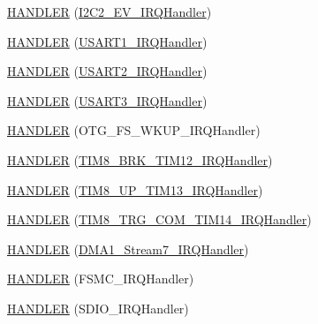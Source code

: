 \begin{DoxyCompactItemize}
\item 
\hyperlink{group___p_i_o_s_ga03be10db0a301a884516b2bec72fd339}{\-H\-A\-N\-D\-L\-E\-R} (\hyperlink{group___revo_mini_gaa32a80208798d6132876a58823ff6202}{\-I2\-C2\-\_\-\-E\-V\-\_\-\-I\-R\-Q\-Handler})
\item 
\hyperlink{group___p_i_o_s_ga9c27c83d8c59cb384efcca34a7aaf531}{\-H\-A\-N\-D\-L\-E\-R} (\hyperlink{group___p_i_o_s___u_s_a_r_t_ga7139cd4baabbbcbab0c1fe6d7d4ae1cc}{\-U\-S\-A\-R\-T1\-\_\-\-I\-R\-Q\-Handler})
\item 
\hyperlink{group___p_i_o_s_gacd95f312186dc47a3c131c7df33a0384}{\-H\-A\-N\-D\-L\-E\-R} (\hyperlink{group___p_i_o_s___u_s_a_r_t_ga0ca6fd0e6f77921dd1123539857ba0a8}{\-U\-S\-A\-R\-T2\-\_\-\-I\-R\-Q\-Handler})
\item 
\hyperlink{group___p_i_o_s_ga5daada32634b528ac183ba5ca2a50d34}{\-H\-A\-N\-D\-L\-E\-R} (\hyperlink{group___p_i_o_s___u_s_a_r_t_ga0d108a3468b2051548183ee5ca2158a0}{\-U\-S\-A\-R\-T3\-\_\-\-I\-R\-Q\-Handler})
\item 
\hyperlink{group___p_i_o_s_ga93013dd7cf810d7c7985096942b4f7f4}{\-H\-A\-N\-D\-L\-E\-R} (\-O\-T\-G\-\_\-\-F\-S\-\_\-\-W\-K\-U\-P\-\_\-\-I\-R\-Q\-Handler)
\item 
\hyperlink{group___p_i_o_s_gaf58ab9a64ef5177e43b0f0ae8157a3b9}{\-H\-A\-N\-D\-L\-E\-R} (\hyperlink{group___p_i_o_s___t_i_m_ga301e0d3520f05f672ce047976f75ff6a}{\-T\-I\-M8\-\_\-\-B\-R\-K\-\_\-\-T\-I\-M12\-\_\-\-I\-R\-Q\-Handler})
\item 
\hyperlink{group___p_i_o_s_gac098e20bbfe6d5c8b1538edd9dc3cf0b}{\-H\-A\-N\-D\-L\-E\-R} (\hyperlink{group___p_i_o_s___t_i_m_ga7fb516f8826d882ac91cfc093884fcf5}{\-T\-I\-M8\-\_\-\-U\-P\-\_\-\-T\-I\-M13\-\_\-\-I\-R\-Q\-Handler})
\item 
\hyperlink{group___p_i_o_s_ga59b4c726aea5cc82c6aaf1d1328d7845}{\-H\-A\-N\-D\-L\-E\-R} (\hyperlink{group___p_i_o_s___t_i_m_ga4c8359a023f7ede4a9d9f94ea6fb92da}{\-T\-I\-M8\-\_\-\-T\-R\-G\-\_\-\-C\-O\-M\-\_\-\-T\-I\-M14\-\_\-\-I\-R\-Q\-Handler})
\item 
\hyperlink{group___p_i_o_s_ga6493d239229d24bde302872ba743c42e}{\-H\-A\-N\-D\-L\-E\-R} (\hyperlink{group___revolution_gae81787590524971351490705554cc351}{\-D\-M\-A1\-\_\-\-Stream7\-\_\-\-I\-R\-Q\-Handler})
\item 
\hyperlink{group___p_i_o_s_ga2fba471dc42fb50c0063056bb0dfd836}{\-H\-A\-N\-D\-L\-E\-R} (\-F\-S\-M\-C\-\_\-\-I\-R\-Q\-Handler)
\item 
\hyperlink{group___p_i_o_s_gadfe9f029aad3b5f4cdf76a9e963028d7}{\-H\-A\-N\-D\-L\-E\-R} (\-S\-D\-I\-O\-\_\-\-I\-R\-Q\-Handler)

\end{DoxyCompactItemize}
